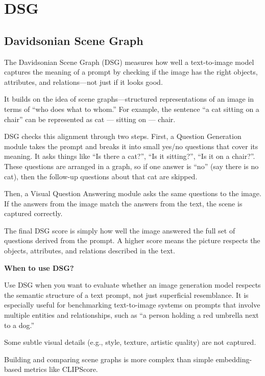 \clearpage
\thispagestyle{genaistyle}
\section{DSG}
\subsection{Davidsonian Scene Graph}

The Davidsonian Scene Graph (DSG) measures how well a text-to-image model captures the meaning of a prompt by checking if the image has the right 
objects, attributes, and relations—not just if it looks good.

It builds on the idea of scene graphs—structured representations of an image in terms of “who does what to whom.” For example, the sentence
“a cat sitting on a chair” can be represented as cat — sitting on — chair.

DSG checks this alignment through two steps. First, a Question Generation module takes the prompt and breaks it into small yes/no questions
that cover its meaning. It asks things like “Is there a cat?”, “Is it sitting?”, “Is it on a chair?”. These questions are arranged in a graph,
so if one answer is “no” (say there is no cat), then the follow-up questions about that cat are skipped.

Then, a Visual Question Answering module asks the same questions to the image. If the answers from the image match the answers from the text,
the scene is captured correctly.

The final DSG score is simply how well the image answered the full set of questions derived from the prompt. A higher score means the picture
respects the objects, attributes, and relations described in the text.


\textbf{When to use DSG?}

Use DSG when you want to evaluate whether an image generation model respects the semantic structure of a text prompt, not just
superficial resemblance. It is especially useful for benchmarking text-to-image systems on prompts that involve multiple entities and
relationships, such as “a person holding a red umbrella next to a dog.”

{
\item Some subtle visual details (e.g., style, texture, artistic quality) are not captured.
\item Building and comparing scene graphs is more complex than simple embedding-based metrics like CLIPScore.
}



